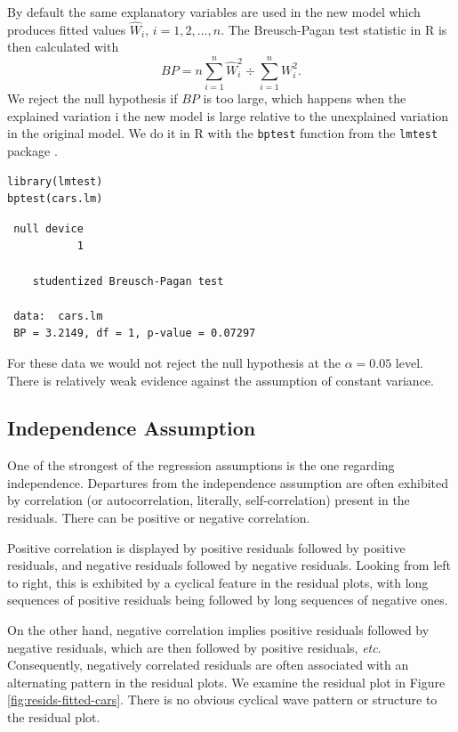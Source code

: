 \documentclass[captions=tableheading]{scrbook}
\begin{document}
By default the same explanatory variables are used in the new model which produces fitted values \(\hat{W}_{i}\), \(i=1,2,\ldots,n\). The Breusch-Pagan test statistic in \textsf{R} is then calculated with 
\begin{equation}
BP=n\sum_{i=1}^{n}\hat{W}_{i}^{2}\div\sum_{i=1}^{n}W_{i}^{2}.
\end{equation}
We reject the null hypothesis if \(BP\) is too large, which happens when the explained variation i the new model is large relative to the unexplained variation in the original model.
We do it in \textsf{R} with the \texttt{bptest} function from the \texttt{lmtest} package \cite{Zeileislmtest}. 

\begin{verbatim}
library(lmtest)
bptest(cars.lm)
\end{verbatim}

\begin{verbatim}
 null device 
           1
  
 	studentized Breusch-Pagan test
 
 data:  cars.lm 
 BP = 3.2149, df = 1, p-value = 0.07297
\end{verbatim}

For these data we would not reject the null hypothesis at the \(\alpha=0.05\) level. There is relatively weak evidence against the assumption of constant variance. 
\subsection{Independence Assumption}
\label{sec-1-4-3}

\label{sub:Independence-Assumption}

One of the strongest of the regression assumptions is the one regarding independence. Departures from the independence assumption are often exhibited by correlation (or autocorrelation, literally, self-correlation) present in the residuals. There can be positive or negative correlation.

Positive correlation is displayed by positive residuals followed by positive residuals, and negative residuals followed by negative residuals. Looking from left to right, this is exhibited by a cyclical feature in the residual plots, with long sequences of positive residuals being followed by long sequences of negative ones.

On the other hand, negative correlation implies positive residuals followed by negative residuals, which are then followed by positive residuals, \emph{etc}. Consequently, negatively correlated residuals are often associated with an alternating pattern in the residual plots. We examine the residual plot in Figure \ref{fig:resids-fitted-cars}. There is no obvious cyclical wave pattern or structure to the residual plot. 
\end{document}
